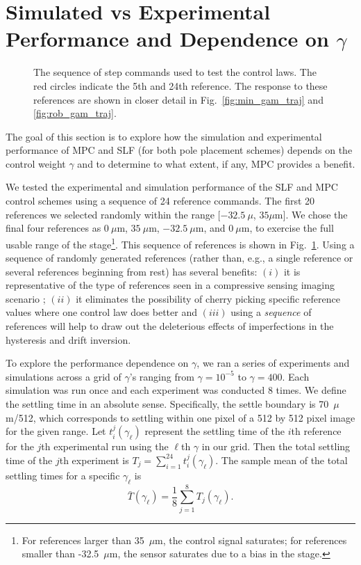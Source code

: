 \documentclass[twocolumn,twoside]{IEEEtran}
\begin{document}
\section{Simulated vs Experimental Performance and Dependence on $\gamma$}\label{sec:results}
\begin{figure}[ht!]
  
  \caption{The sequence of step commands used to test the control laws. The red circles indicate the 5th and 24th reference. The response to these references are shown in closer detail in Fig.~\ref{fig:min_gam_traj} and \ref{fig:rob_gam_traj}.}
  \label{fig:steps}
\end{figure}
The goal of this section is to explore how the simulation and experimental performance of MPC and SLF (for both pole placement schemes) depends on the control weight $\gamma$ and to determine to what extent, if any, MPC provides a benefit.

We tested the experimental and simulation performance of the SLF and MPC control schemes using 
a sequence of 24 reference commands. The first 20 references we selected randomly within the range $[-32.5~\mu$, $35\mu\text{m}]$. We chose the final four references as $0~\mu$m, $35~\mu$m, $-32.5~\mu$m, and $0~\mu$m, to exercise the full usable range of the stage\footnote{For references larger than 35~$\mu$m, the control signal saturates; for references smaller than -32.5~$\mu$m, the sensor saturates due to a bias in the stage.}. This sequence of references is shown in Fig.~\ref{fig:steps}. Using a sequence of randomly generated references (rather than, e.g., a single reference or several references beginning from rest) has several benefits: $(i)$ it is representative of the type of references seen in a compressive sensing imaging scenario \cite{braker_hardware_2018}; $(ii)$ it eliminates the possibility of cherry picking specific reference values where one control law does better and $(iii)$ using a \emph{sequence} of references will help to draw out the deleterious effects of imperfections in the hysteresis and drift inversion.

To explore the performance dependence on $\gamma$, we ran a series of experiments and simulations across a grid of $\gamma$'s ranging from $\gamma=10^{-5}$ to $\gamma=400$. 
Each simulation was run once and each experiment was conducted 8 times. 
We define the settling time in an absolute sense. Specifically, the settle boundary is 70~$\mu$m/512, which corresponds to settling within one pixel of a 512 by 512 pixel image for the given range.
Let $t_i^j(\gamma_{\ell})$ represent the settling time of the $i$th reference for the $j$th experimental run using the $\ell$th $\gamma$ in our grid. Then the total settling time of the $j$th experiment is $T_j = \sum_{i=1}^{24} t_i^j(\gamma_{\ell})$. The sample mean of the total settling times for a specific $\gamma_{\ell}$ is
\begin{equation}
  \bar{T}(\gamma_{\ell}) = \frac{1}{8}\sum_{j=1}^8 T_j(\gamma_{\ell}).
\end{equation}
\end{document}
